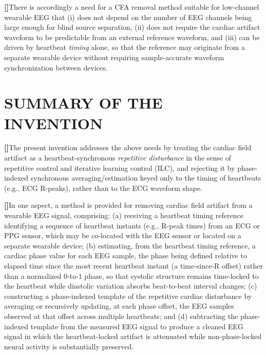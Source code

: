 \documentclass[12pt]{article}
\newcounter{para}
\newcommand{\parnum}{\stepcounter{para}\noindent\textbf{[\thepara]}\quad}
\begin{document}
\parnum There is accordingly a need for a CFA removal method suitable for low-channel wearable EEG that (i) does not depend on the number of EEG channels being large enough for blind source separation, (ii) does not require the cardiac artifact waveform to be predictable from an external reference waveform, and (iii) can be driven by heartbeat \emph{timing} alone, so that the reference may originate from a separate wearable device without requiring sample-accurate waveform synchronization between devices.

\section*{SUMMARY OF THE INVENTION}

\parnum The present invention addresses the above needs by treating the cardiac field artifact as a heartbeat-synchronous \emph{repetitive disturbance} in the sense of repetitive control and iterative learning control (ILC), and rejecting it by phase-indexed synchronous averaging/estimation keyed only to the timing of heartbeats (e.g., ECG R-peaks), rather than to the ECG waveform shape.

\parnum In one aspect, a method is provided for removing cardiac field artifact from a wearable EEG signal, comprising: (a) receiving a heartbeat timing reference identifying a sequence of heartbeat instants (e.g., R-peak times) from an ECG or PPG sensor, which may be co-located with the EEG sensor or located on a separate wearable device; (b) estimating, from the heartbeat timing reference, a cardiac phase value for each EEG sample, the phase being defined relative to elapsed time since the most recent heartbeat instant (a time-since-R offset) rather than a normalized 0-to-1 phase, so that systolic structure remains time-locked to the heartbeat while diastolic variation absorbs beat-to-beat interval changes; (c) constructing a phase-indexed template of the repetitive cardiac disturbance by averaging or recursively updating, at each phase offset, the EEG samples observed at that offset across multiple heartbeats; and (d) subtracting the phase-indexed template from the measured EEG signal to produce a cleaned EEG signal in which the heartbeat-locked artifact is attenuated while non-phase-locked neural activity is substantially preserved.
\end{document}
